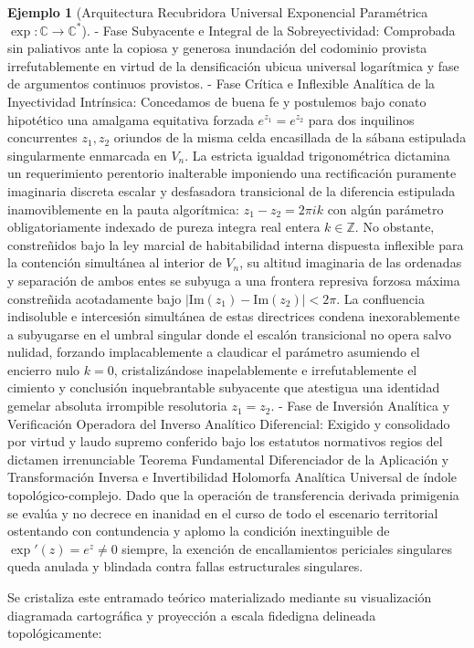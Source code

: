 \documentclass[11pt,a4paper]{article}
\theoremstyle{definition}
\newtheorem{ejemplo}{Ejemplo}[section]
\theoremstyle{remark}
\numberwithin{equation}{section}
\begin{document}
\begin{ejemplo}[Arquitectura Recubridora Universal Exponencial Paramétrica $\exp: \mathbb{C} \to \mathbb{C}^*$]
- Fase Subyacente e Integral de la Sobreyectividad: Comprobada sin paliativos ante la copiosa y generosa inundación del codominio provista irrefutablemente en virtud de la densificación ubicua universal logarítmica y fase de argumentos continuos provistos.
- Fase Crítica e Inflexible Analítica de la Inyectividad Intrínsica: Concedamos de buena fe y postulemos bajo conato hipotético una amalgama equitativa forzada $e^{z_1} = e^{z_2}$ para dos inquilinos concurrentes $z_1, z_2$ oriundos de la misma celda encasillada de la sábana estipulada singularmente enmarcada en $V_n$. La estricta igualdad trigonométrica dictamina un requerimiento perentorio inalterable imponiendo una rectificación puramente imaginaria discreta escalar y desfasadora transicional de la diferencia estipulada inamoviblemente en la pauta algorítmica: $z_1 - z_2 = 2\pi i k$ con algún parámetro obligatoriamente indexado de pureza integra real entera $k \in \mathbb{Z}$. No obstante, constreñidos bajo la ley marcial de habitabilidad interna dispuesta inflexible para la contención simultánea al interior de $V_n$, su altitud imaginaria de las ordenadas y separación de ambos entes se subyuga a una frontera represiva forzosa máxima constreñida acotadamente bajo $|\text{Im}(z_1) - \text{Im}(z_2)| < 2\pi$. La confluencia indisoluble e intercesión simultánea de estas directrices condena inexorablemente a subyugarse en el umbral singular donde el escalón transicional no opera salvo nulidad, forzando implacablemente a claudicar el parámetro asumiendo el encierro nulo $k = 0$, cristalizándose inapelablemente e irrefutablemente el cimiento y conclusión inquebrantable subyacente que atestigua una identidad gemelar absoluta irrompible resolutoria $z_1 = z_2$.
- Fase de Inversión Analítica y Verificación Operadora del Inverso Analítico Diferencial: Exigido y consolidado por virtud y laudo supremo conferido bajo los estatutos normativos regios del dictamen irrenunciable Teorema Fundamental Diferenciador de la Aplicación y Transformación Inversa e Invertibilidad Holomorfa Analítica Universal de índole topológico-complejo. Dado que la operación de transferencia derivada primigenia se evalúa y no decrece en inanidad en el curso de todo el escenario territorial ostentando con contundencia y aplomo la condición inextinguible de $\exp'(z) = e^z \neq 0$ siempre, la exención de encallamientos periciales singulares queda anulada y blindada contra fallas estructurales singulares.

Se cristaliza este entramado teórico materializado mediante su visualización diagramada cartográfica y proyección a escala fidedigna delineada topológicamente:
\begin{center}
\end{center}
\end{ejemplo}
\end{document}
